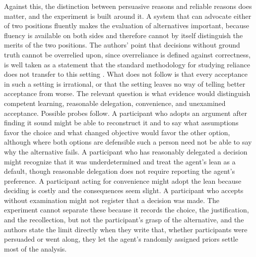 \documentclass[11pt]{article}
\begin{document}
Against this, the distinction between persuasive reasons and reliable reasons does matter, and the experiment is built around it. A system that can advocate either of two positions fluently makes the evaluation of alternatives important, because fluency is available on both sides and therefore cannot by itself distinguish the merits of the two positions. The authors' point that decisions without ground truth cannot be overrelied upon, since overreliance is defined against correctness, is well taken as a statement that the standard methodology for studying reliance does not transfer to this setting \cite{herdagdelen}. What does not follow is that every acceptance in such a setting is irrational, or that the setting leaves no way of telling better acceptance from worse. The relevant question is what evidence would distinguish competent learning, reasonable delegation, convenience, and unexamined acceptance. Possible probes follow. A participant who adopts an argument after finding it sound might be able to reconstruct it and to say what assumptions favor the choice and what changed objective would favor the other option, although where both options are defensible such a person need not be able to say why the alternative fails. A participant who has reasonably delegated a decision might recognize that it was underdetermined and treat the agent's lean as a default, though reasonable delegation does not require reporting the agent's preference. A participant acting for convenience might adopt the lean because deciding is costly and the consequences seem slight. A participant who accepts without examination might not register that a decision was made. The experiment cannot separate these because it records the choice, the justification, and the recollection, but not the participant's grasp of the alternative, and the authors state the limit directly when they write that, whether participants were persuaded or went along, they let the agent's randomly assigned priors settle most of the analysis.
\end{document}
